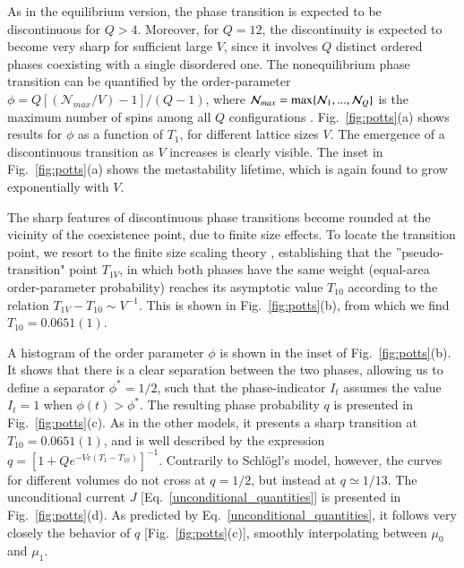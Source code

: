 \documentclass[aps,pre,reprint, amsmath, amssymb,superscriptaddress]{revtex4-1}
\begin{document}
As in the equilibrium version,
the phase transition is expected to be
discontinuous for $Q>4$.
Moreover, for $Q = 12$, the discontinuity is expected to become very sharp  for sufficient large $V$,  since it involves $Q$ distinct
ordered phases coexisting with a single disordered one.
The nonequilibrium phase transition can be quantified by the order-parameter $\phi={Q}[(\mathcal{N}_{max}/V)-1]/({Q}-1)$, where $\mathcal{N}_{max}={\rm max}\{\mathcal{N}_1,...,\mathcal{N}_{Q}\}$ is the maximum number of spins among all $Q$ configurations \cite{fiorejcp2013,challa}. 
Fig.~\ref{fig:potts}(a) shows results for $\phi$ as a function of $T_1$, for different lattice sizes $V$. 
The emergence of a discontinuous transition as $V$ increases is clearly visible. 
The inset in Fig.~\ref{fig:potts}(a) shows the metastability lifetime, which is again found to grow exponentially with $V$. 


The sharp features of discontinuous phase transitions become  rounded at the vicinity of the coexistence point, due to finite size effects. 
To locate the transition point, we resort to the finite size scaling theory \cite{fiore2018}, establishing that  the ''pseudo-transition" point
$T_{1V}$, in which both phases have the same weight (equal-area order-parameter probability) reaches its asymptotic value $T_{10}$ according to the relation $T_{1V}-T_{10} \sim V^{-1}$. This is shown in Fig.~\ref{fig:potts}(b), from which we find  $T_{10}=0.0651(1)$.

A histogram of the order parameter $\phi$ is shown in the inset of Fig.~\ref{fig:potts}(b). It shows that  there is a clear separation between the two phases, allowing us to define a separator $\phi^* = 1/2$, such that the phase-indicator $I_t$ assumes the value $I_t=1$ when $\phi(t) >  \phi^*$.
The resulting phase probability $q$ is presented in Fig.~\ref{fig:potts}(c). 
As in the other models, it presents a sharp transition at $T_{10}=0.0651(1)$, and is well described by the expression $q=[1 + Q e^{-Vc(T_1-T_{10})}]^{-1}$.
Contrarily to Schl\"ogl's model, however, the curves for different volumes do not cross at $q = 1/2$, but instead at $q \simeq 1/13$. 
The unconditional current $J$ [Eq.~\eqref{unconditional_quantities}] is presented in Fig.~\ref{fig:potts}(d). 
As predicted by Eq.~\eqref{unconditional_quantities}, it follows very closely the behavior of $q$ [Fig.~\ref{fig:potts}(c)], smoothly interpolating between  $\mu_0$ and $\mu_1$. 
\end{document}
